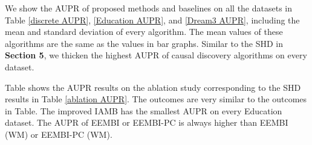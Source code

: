 \documentclass[twoside,11pt]{article}
\begin{document}
\begin{table*}[htpb]
\centering
\fontsize{10}{22}\selectfont
\caption{AUPR on Dream3 datasets}\label{ablation AUPR}
\end{table*}


We show the AUPR of proposed methods and baselines on all the datasets in Table \ref{discrete AUPR}, \ref{Education AUPR}, and \ref{Dream3 AUPR}, including the mean and standard deviation of every algorithm. The mean values of these algorithms are the same as the values in bar graphs. Similar to the SHD in \textbf{Section 5}, we thicken the highest AUPR of causal discovery algorithms on every dataset.

Table shows the AUPR results on the ablation study corresponding to the SHD results in Table \ref{ablation AUPR}. The outcomes are very similar to the outcomes in Table. The improved IAMB has the smallest AUPR on every Education dataset. The AUPR of EEMBI or EEMBI-PC is always higher than EEMBI (WM) or EEMBI-PC (WM).


\newpage
\vskip 0.2in

\end{document}
